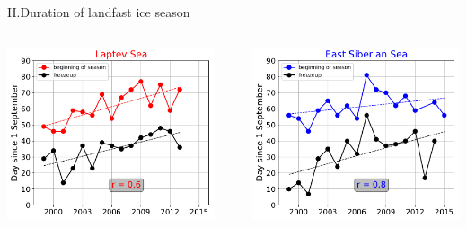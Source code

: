 \documentclass[8pt]{beamer}
\begin{document}
\setwatermark{\fontsize{125pt}{125pt}\selectfont{}}
\begin{frame}[fragile]{II.Duration of landfast ice season}
	\begin{columns}
		\includegraphics[width=1\textwidth]{./img/Beginning_frzp_LS.pdf}
		\begin{block}{\centering}
			\centering
		\end{block}
		\includegraphics[width=1\textwidth]{./img/Beginning_frzp_ESS.pdf}
	\end{columns}
\end{frame}

\


%
%
%
\end{document}
